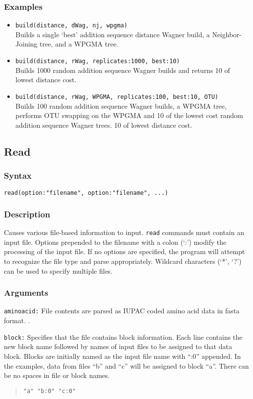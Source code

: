 \documentclass[11pt]{article}
\begin{document}
		\subsubsection{Examples}
			\begin{itemize}
				\item{\texttt{build(distance, dWag, nj, wpgma)}\\Builds a single `best' addition sequence distance Wagner build, a Neighbor-Joining tree, and a WPGMA tree.}
				\item{\texttt{build(distance, rWag, replicates:1000, best:10)}\\Builds 1000 random addition sequence  Wagner builds and returns  
				10 of lowest distance cost.}
				\item{\texttt{build(distance, rWag, WPGMA, replicates:100, best:10, OTU)} \\Builds 100 random addition sequence  Wagner builds, a WPGMA tree, performs OTU swapping on the WPGMA and 10 of the lowest cost random addition sequence Wagner trees. 
			10 of lowest distance cost.}
			\end{itemize}
	\subsection{Read}
		\subsubsection{Syntax}
				\texttt{read(option:"filename", option:"filename", ...)}
			
		\subsubsection{Description}
		Causes various file-based information to input.  \texttt{read} commands must contain an input file.
		Options prepended to the filename with a colon (`:') modify the processing of the input file. If no options are specified, 
		the program will attempt to recognize the file type and parse appropriately.  Wildcard characters (`*', `?') can be used to specify multiple files.
		\subsubsection{Arguments}
			\noindent \texttt{aminoacid:} File contents are parsed as IUPAC coded amino acid data in fasta \citep{PearsonandLipman1988} format. .
		
			\smallskip		
			\noindent \texttt{block:} Specifies that the file contains block information. Each line contains 
			the new block name followed by names of input files to be assigned to that data block.  
			Blocks are initially named as the input file name with ``:0'' appended.  
			In the examples, data from files ``b'' and ``c'' will be assigned to block ``a''.  There can be no spaces in file or block names.
			\begin{quote}
				\texttt{"a" "b:0" "c:0"}\\
			\end{quote}
			
\end{document}
